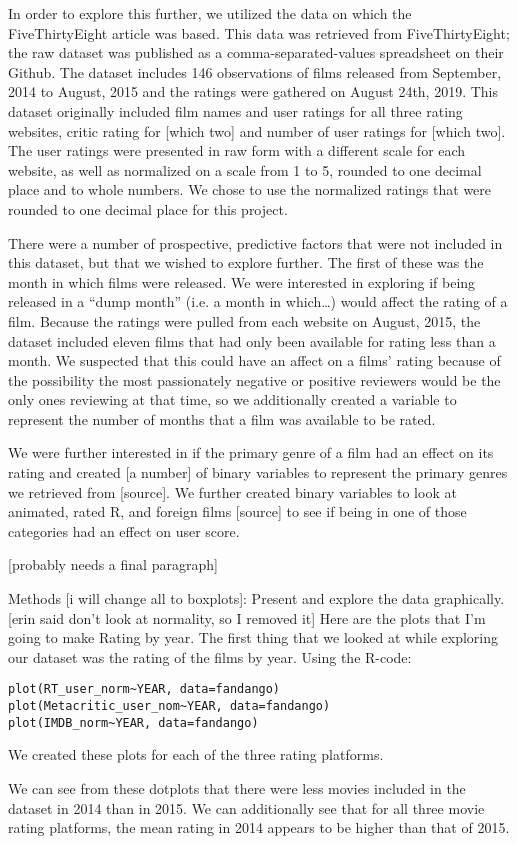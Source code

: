 \documentclass[a4paper,12pt]{report}
\begin{document}
	In order to explore this further, we utilized the data on which the FiveThirtyEight article was based. This data was retrieved from FiveThirtyEight; the raw dataset was published as a comma-separated-values spreadsheet on their Github. The dataset includes 146 observations of films released from September, 2014 to August, 2015 and the ratings were gathered on August 24th, 2019. This dataset originally included film names and user ratings for all three rating websites, critic rating for [which two] and number of user ratings for [which two]. The user ratings were presented in raw form with a different scale for each website, as well as normalized on a scale from 1 to 5, rounded to one decimal place and to whole numbers. We chose to use the normalized ratings that were rounded to one decimal place for this project. 

	There were a number of prospective, predictive factors that were not included in this dataset, but that we wished to explore further. The first of these was the month in which films were released. We were interested in exploring if being released in a “dump month” (i.e. a month in which…) would affect the rating of a film. Because the ratings were pulled from each website on August, 2015, the dataset included eleven films that had only been available for rating less than a month. We suspected that this could have an affect on a films’ rating because of the possibility the most passionately negative or positive reviewers would be the only ones reviewing at that time, so we additionally created a variable to represent the number of months that a film was available to be rated. 

	We were further interested in if the primary genre of a film had an effect on its rating and created [a number] of binary variables to represent the primary genres we retrieved from [source]. We further created binary variables to look at animated, rated R, and foreign films [source] to see if being in one of those categories had an effect on user score. 

	[probably needs a final paragraph]

	Methods [i will change all to boxplots]: 
	Present and explore the data graphically. 
	[erin said don’t look at normality, so I removed it] 
	Here are the plots that I’m going to make 
	Rating by year. 
	The first thing that we looked at while exploring our dataset was the rating of the films by year. Using the R-code:
\begin{verbatim}
plot(RT_user_norm~YEAR, data=fandango)
plot(Metacritic_user_nom~YEAR, data=fandango)
plot(IMDB_norm~YEAR, data=fandango)
\end{verbatim}
	We created these plots for each of the three rating platforms.
	\begin{center}
	\end{center}
	We can see from these dotplots that there were less movies included in the dataset in 2014 than in 2015.  We can additionally see that for all three movie rating platforms, the mean rating in 2014 appears to be higher than that of 2015. 
\end{document}
